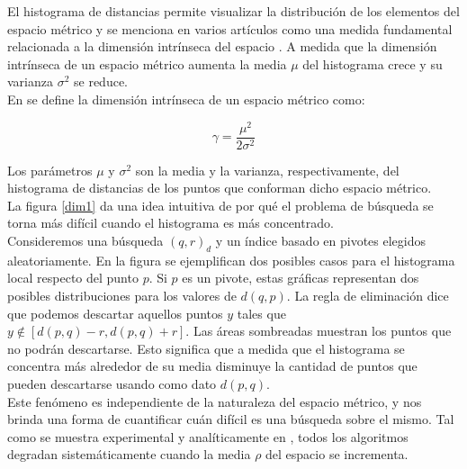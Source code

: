 El histograma de distancias permite visualizar la distribuci\'on de los elementos del espacio m\'etrico y se menciona en varios art\'iculos como una medida fundamental relacionada a la dimensi\'on intr\'inseca del espacio \cite{Bri95, CM97, cn00,alenex,CPZ98a}. A medida que la dimensi\'on intr\'inseca de un espacio m\'etrico aumenta la media  $\mu$ del histograma crece y su varianza $\sigma^{2}$ se reduce.\\

\noindent En \cite{oursurvey} se define la dimensi\'on intr\'inseca de un espacio m\'etrico como:

\[
\gamma = \frac{\mu^2}{2\sigma^2}
\]

Los par\'ametros $\mu$ y $\sigma^2$ son la media y la varianza, respectivamente, del histograma de distancias de los puntos que conforman dicho espacio m\'etrico.\\

La figura \ref{dim1} da una idea intuitiva de por qu\'e el problema de b\'usqueda se torna m\'as dif\'icil cuando el histograma es m\'as concentrado.\\

Consideremos una b\'usqueda $(q,r)_{d}$ y un \'indice basado en pivotes elegidos aleatoriamente. En la figura se ejemplifican dos posibles casos para el histograma local respecto del punto $p$. Si $p$ es un pivote, estas gr\'aficas representan dos posibles distribuciones para los valores de $d(q,p)$. La regla de eliminaci\'on dice que podemos descartar aquellos puntos $y$ tales que  $y \notin [d(p,q)-r, d(p,q) + r]$. Las \'areas sombreadas muestran  los puntos que no podr\'an descartarse. Esto significa que a medida que el histograma se concentra m\'as alrededor de su media disminuye la cantidad de puntos que pueden descartarse usando como dato $d(p,q)$.\\

Este fen\'omeno es independiente de la naturaleza del espacio m\'etrico,  y nos brinda una forma de cuantificar cu\'an dif\'icil es una b\'usqueda sobre el mismo. Tal como se muestra experimental y anal\'iticamente en \cite{oursurvey}, todos los algoritmos degradan  sistem\'aticamente cuando la media $\rho$ del espacio se incrementa.\\